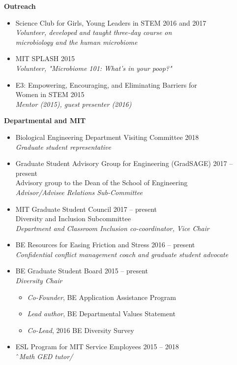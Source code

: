 \documentclass[10pt]{article}
\newenvironment{outerlist}[1][\enskip\textbullet]%
        {\begin{itemize}[#1,leftmargin=*]}{\end{itemize}%
         \vspace{-.6\baselineskip}}
\newenvironment{innerlist}[1][\enskip\textbullet]%
        {\begin{itemize}[#1,leftmargin=*,parsep=0pt,itemsep=0pt,topsep=0pt,partopsep=0pt]}
        {\end{itemize}}
\begin{document}
\textbf{Outreach}
\begin{outerlist}
	\item[] Science Club for Girls, Young Leaders in STEM \hfill {2016 and 2017} \\ \textit{Volunteer, developed and taught three-day course on} \\ \textit{microbiology and the human microbiome} 
	\item[] MIT SPLASH \hfill 2015 \\
	\textit{Volunteer, "Microbiome 101: What's in your poop?"}
	\item[] E3: Empowering, Encouraging, and Eliminating Barriers for \\ Women in STEM \hfill 2015 \\
	\textit{Mentor (2015), guest presenter (2016)}
\end{outerlist}
\vspace{.15in}

\textbf{Departmental and MIT}
\begin{outerlist}
	\item[] Biological Engineering Department Visiting Committee \hfill {2018} \\
	\textit{Graduate student representative}
	\item[] Graduate Student Advisory Group for Engineering (GradSAGE) \hfill {2017 -- present} \\
	Advisory group to the Dean of the School of Engineering \\
	\textit{Advisor/Advisee Relations Sub-Committee}
	\item[] MIT Graduate Student Council \hfill {2017 -- present} \\
		Diversity and Inclusion Subcommittee  \\
		\textit{Department and Classroom Inclusion co-coordinator, Vice Chair} 
	\item[] BE Resources for Easing Friction and Stress \hfill {2016 -- present} \\
	\textit{Confidential conflict management coach and graduate student advocate}
	\item[] BE Graduate Student Board \hfill {2015 -- present} \\ 
		\textit{Diversity Chair} 
		\begin{innerlist}
			\item[] \textit{Co-Founder}, BE Application Assistance Program 
			\item[] \textit{Lead author}, BE Departmental Values Statement 
			\item[] \textit{Co-Lead}, 2016 BE Diversity Survey
		\end{innerlist}
	\item[] ESL Program for MIT Service Employees \hfill {2015 -- 2018} \\
	ˆ\textit{Math GED tutor/}
\end{outerlist}
\vspace{.15in}
\end{document}
